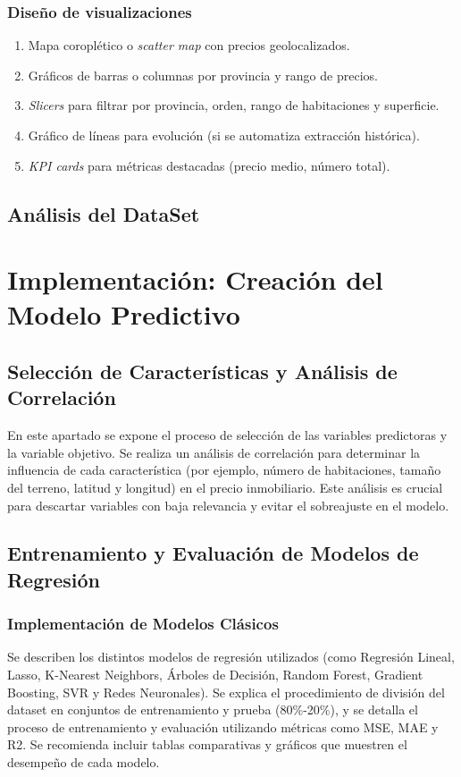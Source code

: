 \documentclass[a4paper,11pt]{book}
\begin{document}
\subsection{Diseño de visualizaciones}

\begin{enumerate}
    \item Mapa coroplético o \textit{scatter map} con precios geolocalizados.
    \item Gráficos de barras o columnas por provincia y rango de precios.
    \item \textit{Slicers} para filtrar por provincia, orden, rango de habitaciones y superficie.
    \item Gráfico de líneas para evolución (si se automatiza extracción histórica).
    \item \textit{KPI cards} para métricas destacadas (precio medio, número total).
\end{enumerate}

\section{Análisis del DataSet}

\chapter{Implementación: Creación del Modelo Predictivo}
\section{Selección de Características y Análisis de Correlación}
En este apartado se expone el proceso de selección de las variables predictoras y la variable objetivo. Se realiza un análisis de correlación para determinar la influencia de cada característica (por ejemplo, número de habitaciones, tamaño del terreno, latitud y longitud) en el precio inmobiliario. Este análisis es crucial para descartar variables con baja relevancia y evitar el sobreajuste en el modelo.

\section{Entrenamiento y Evaluación de Modelos de Regresión}
\subsection{Implementación de Modelos Clásicos}
Se describen los distintos modelos de regresión utilizados (como Regresión Lineal, Lasso, K-Nearest Neighbors, Árboles de Decisión, Random Forest, Gradient Boosting, SVR y Redes Neuronales). Se explica el procedimiento de división del dataset en conjuntos de entrenamiento y prueba (80\%-20\%), y se detalla el proceso de entrenamiento y evaluación utilizando métricas como MSE, MAE y R2. Se recomienda incluir tablas comparativas y gráficos que muestren el desempeño de cada modelo.
\end{document}

